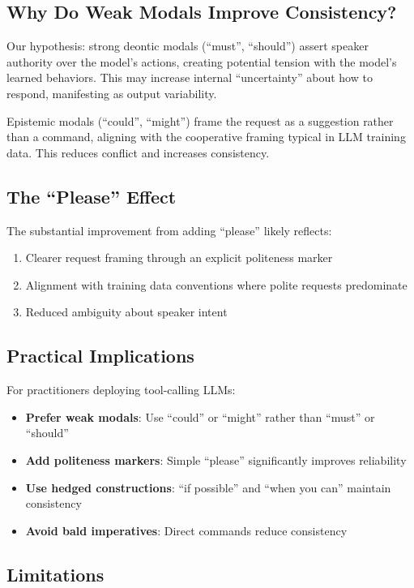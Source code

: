 \documentclass[11pt]{article}
\begin{document}
\subsection{Why Do Weak Modals Improve Consistency?}

Our hypothesis: strong deontic modals (``must'', ``should'') assert speaker authority over the model's actions, creating potential tension with the model's learned behaviors. This may increase internal ``uncertainty'' about how to respond, manifesting as output variability.

Epistemic modals (``could'', ``might'') frame the request as a suggestion rather than a command, aligning with the cooperative framing typical in LLM training data. This reduces conflict and increases consistency.

\subsection{The ``Please'' Effect}

The substantial improvement from adding ``please'' likely reflects:
\begin{enumerate}
    \item Clearer request framing through an explicit politeness marker
    \item Alignment with training data conventions where polite requests predominate
    \item Reduced ambiguity about speaker intent
\end{enumerate}

\subsection{Practical Implications}

For practitioners deploying tool-calling LLMs:
\begin{itemize}
    \item \textbf{Prefer weak modals}: Use ``could'' or ``might'' rather than ``must'' or ``should''
    \item \textbf{Add politeness markers}: Simple ``please'' significantly improves reliability
    \item \textbf{Use hedged constructions}: ``if possible'' and ``when you can'' maintain consistency
    \item \textbf{Avoid bald imperatives}: Direct commands reduce consistency
\end{itemize}

\subsection{Limitations}
\end{document}
